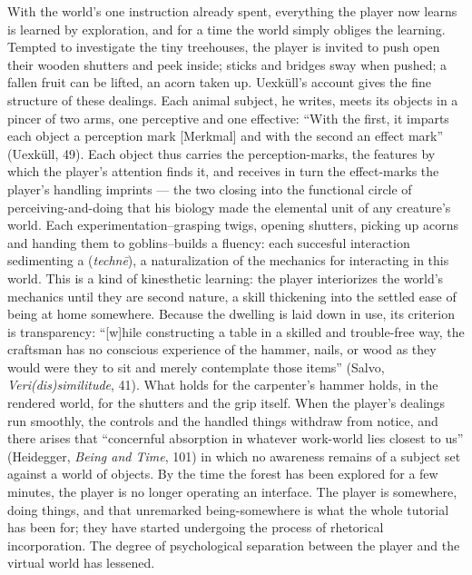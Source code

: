 \documentclass{article}
\begin{document}
With the world's one instruction already spent, everything the player now learns is learned by exploration, and for a time the world simply obliges the learning. Tempted to investigate the tiny treehouses, the player is invited to push open their wooden shutters and peek inside; sticks and bridges sway when pushed; a fallen fruit can be lifted, an acorn taken up. Uexküll's account gives the fine structure of these dealings. Each animal subject, he writes, meets its objects in a pincer of two arms, one perceptive and one effective: ``With the first, it imparts each object a perception mark [Merkmal] and with the second an effect mark'' (Uexküll, 49). Each object thus carries the perception-marks, the features by which the player's attention finds it, and receives in turn the effect-marks the player's handling imprints — the two closing into the functional circle of perceiving-and-doing that his biology made the elemental unit of any creature's world. Each experimentation--grasping twigs, opening shutters, picking up acorns and handing them to goblins--builds a fluency: each succesful interaction sedimenting a (\textit{technē}), a naturalization of the mechanics for interacting in this world. This is a kind of kinesthetic learning: the player interiorizes the world's mechanics until they are second nature, a skill thickening into the settled ease of being at home somewhere. Because the dwelling is laid down in use, its criterion is transparency: ``[w]hile constructing a table in a skilled and trouble-free way, the craftsman has no conscious experience of the hammer, nails, or wood as they would were they to sit and merely contemplate those items'' (Salvo, \textit{Veri(dis)similitude}, 41). What holds for the carpenter's hammer holds, in the rendered world, for the shutters and the grip itself. When the player's dealings run smoothly, the controls and the handled things withdraw from notice, and there arises that ``concernful absorption in whatever work-world lies closest to us'' (Heidegger, \textit{Being and Time}, 101) in which no awareness remains of a subject set against a world of objects. By the time the forest has been explored for a few minutes, the player is no longer operating an interface. The player is somewhere, doing things, and that unremarked being-somewhere is what the whole tutorial has been for; they have started undergoing the process of rhetorical incorporation. The degree of psychological separation between the player and the virtual world has lessened.
\end{document}
